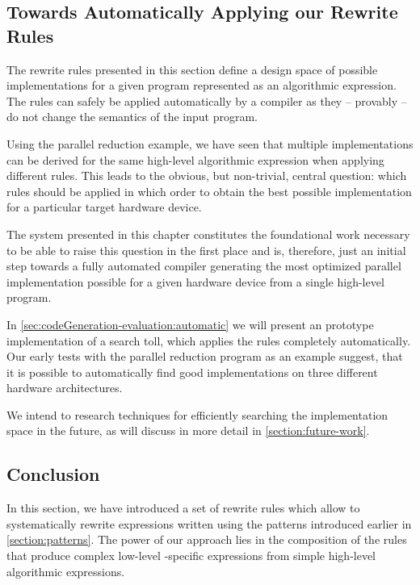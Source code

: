 \FloatBarrier

\subsection{Towards Automatically Applying our Rewrite Rules}
The rewrite rules presented in this section define a design space of possible implementations for a given program represented as an algorithmic expression.
The rules can safely be applied automatically by a compiler as they -- provably -- do not change the semantics of the input program.

Using the parallel reduction example, we have seen that multiple implementations can be derived for the same high-level algorithmic expression when applying different rules.
This leads to the obvious, but non-trivial, central question:
which rules should be applied in which order to obtain the best possible implementation for a particular target hardware device.

The system presented in this chapter constitutes the foundational work necessary to be able to raise this question in the first place and is, therefore, just an initial step towards a fully automated compiler generating the most optimized parallel implementation possible for a given hardware device from a single high-level program.

In \autoref{sec:codeGeneration-evaluation:automatic} we will present an prototype implementation of a search toll, which applies the rules completely automatically.
Our early tests with the parallel reduction program as an example suggest, that it is possible to automatically find good implementations on three different hardware architectures.

We intend to research techniques for efficiently searching the implementation space in the future, as will discuss in more detail in \autoref{section:future-work}.



\subsection{Conclusion}
In this section, we have introduced a set of rewrite rules which allow to systematically rewrite expressions written using the patterns introduced earlier in \autoref{section:patterns}.
The power of our approach lies in the composition of the rules that produce complex low-level \OpenCL-specific expressions from simple high-level algorithmic expressions.

